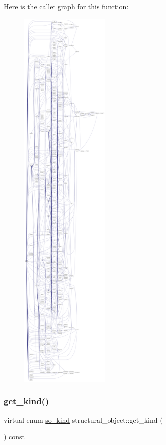 Here is the caller graph for this function\+:
\nopagebreak
\begin{figure}[H]
\begin{center}
\leavevmode
\includegraphics[height=550pt]{d8/da3/classstructural__object_a53e1999ebc946f37a981507d4ef72650_icgraph}
\end{center}
\end{figure}
\mbox{\label{classstructural__object_ad9f487c3b7774ecd4e2f55979c434cd0}} 
\subsubsection{\texorpdfstring{get\+\_\+kind()}{get\_kind()}}
{\footnotesize\ttfamily virtual enum \hyperlink{structural__objects_8hpp_acf52399aecacb7952e414c5746ce6439}{so\+\_\+kind} structural\+\_\+object\+::get\+\_\+kind (\begin{DoxyParamCaption}{ }\end{DoxyParamCaption}) const\hspace{0.3cm}{\ttfamily [pure virtual]}}



